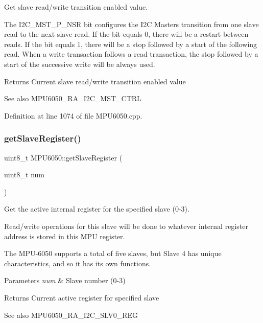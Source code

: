 Get slave read/write transition enabled value. 

The I2\+C\+\_\+\+M\+S\+T\+\_\+\+P\+\_\+\+N\+SR bit configures the I2C Master\textquotesingle{}s transition from one slave read to the next slave read. If the bit equals 0, there will be a restart between reads. If the bit equals 1, there will be a stop followed by a start of the following read. When a write transaction follows a read transaction, the stop followed by a start of the successive write will be always used.

\begin{DoxyReturn}{Returns}
Current slave read/write transition enabled value 
\end{DoxyReturn}
\begin{DoxySeeAlso}{See also}
M\+P\+U6050\+\_\+\+R\+A\+\_\+\+I2\+C\+\_\+\+M\+S\+T\+\_\+\+C\+T\+RL 
\end{DoxySeeAlso}


Definition at line 1074 of file M\+P\+U6050.\+cpp.

\mbox{\label{classMPU6050_ae7e9ead9645bcef326eb579c6ab5d5ff}} 
\subsubsection{\texorpdfstring{getSlaveRegister()}{getSlaveRegister()}}
{\footnotesize\ttfamily uint8\+\_\+t M\+P\+U6050\+::get\+Slave\+Register (\begin{DoxyParamCaption}\item[{uint8\+\_\+t}]{num }\end{DoxyParamCaption})}



Get the active internal register for the specified slave (0-\/3). 

Read/write operations for this slave will be done to whatever internal register address is stored in this M\+PU register.

The M\+P\+U-\/6050 supports a total of five slaves, but Slave 4 has unique characteristics, and so it has its own functions.


\begin{DoxyParams}{Parameters}
{\em num} & Slave number (0-\/3) \\
\hline
\end{DoxyParams}
\begin{DoxyReturn}{Returns}
Current active register for specified slave 
\end{DoxyReturn}
\begin{DoxySeeAlso}{See also}
M\+P\+U6050\+\_\+\+R\+A\+\_\+\+I2\+C\+\_\+\+S\+L\+V0\+\_\+\+R\+EG 
\end{DoxySeeAlso}


